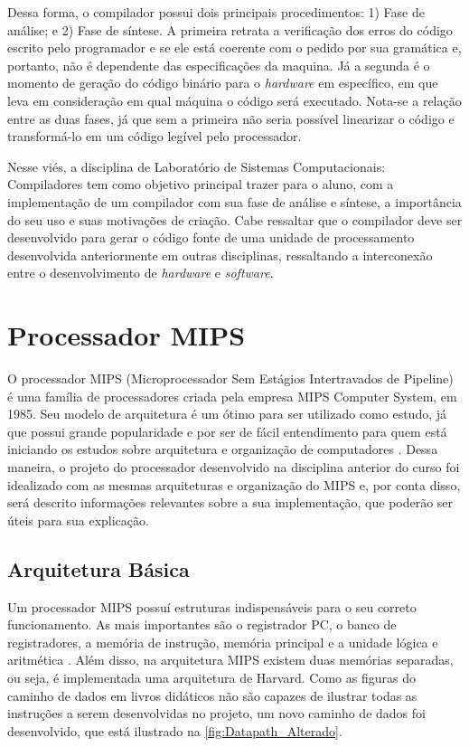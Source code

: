 \documentclass[
	12pt,				%
	oneside,
	a4paper,			%
	english,			%
	french,				%
	spanish,			%
	brazil,				%
	]{abntex2}
\begin{document}
Dessa forma, o compilador possui dois principais procedimentos: 1) Fase de análise; e 2) Fase de síntese. A primeira retrata a verificação dos erros do código escrito pelo programador e se ele está coerente com o pedido por sua gramática e, portanto, não é dependente das especificações da maquina. Já a segunda é o momento de geração do código binário para o \emph{hardware} em específico, em que leva em consideração em qual máquina o código será executado. Nota-se a relação entre as duas fases, já que sem a primeira não seria possível linearizar o código e transformá-lo em um código legível pelo processador.

Nesse viés, a disciplina de Laboratório de Sistemas Computacionais: Compiladores tem como objetivo principal trazer para o aluno, com a implementação de um compilador com sua fase de análise e síntese, a importância do seu uso e suas motivações de criação. Cabe ressaltar que o compilador deve ser desenvolvido para gerar o código fonte de uma unidade de processamento desenvolvida anteriormente em outras disciplinas, ressaltando a interconexão entre o desenvolvimento de \emph{hardware} e \emph{software}.


\chapter{Processador MIPS}

O processador MIPS (Microprocessador Sem Estágios Intertravados de Pipeline) é uma família de processadores criada pela empresa MIPS Computer System, em 1985. Seu modelo de arquitetura é um ótimo para ser utilizado como estudo, já que possui grande popularidade e por ser de fácil entendimento para quem está iniciando os estudos sobre arquitetura e organização de computadores \cite{patterson2006}. Dessa maneira, o projeto do processador desenvolvido na disciplina anterior do curso foi idealizado com as mesmas arquiteturas e organização do MIPS e, por conta disso, será descrito informações relevantes sobre a sua implementação, que poderão ser úteis para sua explicação.

\section{Arquitetura Básica}

Um processador MIPS possuí estruturas indispensáveis para o seu correto funcionamento. As mais importantes são o registrador PC, o banco de registradores, a memória de instrução, memória principal e a unidade lógica e aritmética \cite{patterson2017}. Além disso, na arquitetura MIPS existem duas memórias separadas, ou seja, é implementada uma arquitetura de Harvard. Como as figuras do caminho de dados em livros didáticos não são capazes de ilustrar todas as instruções a serem desenvolvidas no projeto, um novo caminho de dados foi desenvolvido, que está ilustrado na \autoref{fig:Datapath_Alterado}.
\end{document}
